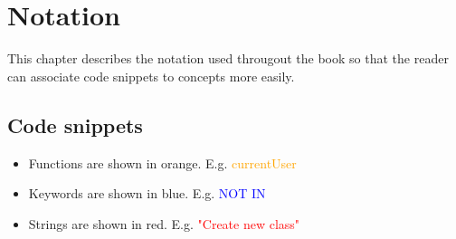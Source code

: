 \newpage
\chapter{Notation}

This chapter describes the notation used througout the book so that the reader can associate code snippets to concepts more easily.

\section{Code snippets}

\begin{itemize}
    \item Functions are shown in orange. E.g. \textcolor{orange}{currentUser}
    \item Keywords are shown in blue. E.g. \textcolor{blue}{NOT IN}
    \item Strings are shown in red. E.g. \textcolor{red}{"Create new class"}
\end{itemize}
